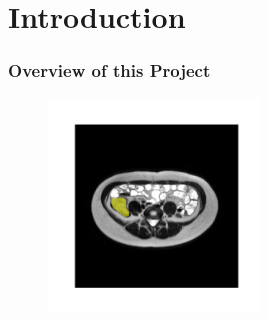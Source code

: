 \documentclass{beamer}
\begin{document}
\section{Introduction} %
\begin{frame}
	\frametitle{Overview of this Project}
	\begin{figure}[hp]
		\centering
		\includegraphics[width=0.5\textwidth]{../figures/seg_medsam.png}
	\end{figure}
\end{frame}
\end{document}
